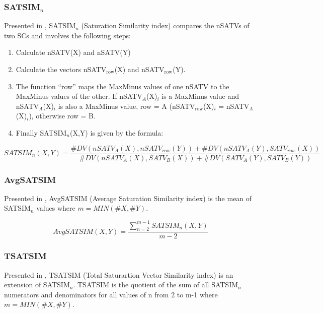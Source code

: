 \documentclass{article}
\begin{document}
\subsubsection{SATSIM$_{n}$}
\label{sec-13-9-2}

Presented in \citet[chap. 2.4]{Buchler1997}, SATSIM$_{n}$ (Saturation
Similarity index) compares the nSATVs of two SCs and involves the
following steps:
\begin{enumerate}
\item Calculate nSATV(X) and nSATV(Y)
\item Calculate the vectors nSATV$_{\mathrm{row}}$(X) and nSATV$_{\mathrm{row}}$(Y).
\item The function ``row'' maps the MaxMinus values of one nSATV to the
   MaxMinus values of the other. If nSATV$_{A}$(X)$_{i}$ is a MaxMinus
   value and nSATV$_{A}$(X)$_{i}$ is also a MaxMinus value, row = A
   (nSATV$_{\mathrm{row}}$(X)$_{i}$ = nSATV$_{A}$(X)$_{i}$), otherwise row = B.
\item Finally SATSIM$_{n}$(X,Y) is given by the formula:
\end{enumerate}

$$SATSIM_{n}(X,Y)=\frac{\#DV(nSATV_{A}(X),nSATV_{row}(Y))+\#DV(nSATV_{A}(Y),SATV_{row}(X))}{\#DV(nSATV_{A}(X),SATV_{B}(X))+\#DV(SATV_{A}(Y),SATV_{B}(Y))}$$
\subsubsection{AvgSATSIM}
\label{sec-13-9-3}

Presented in \citet[chap. 2.10]{Buchler1997}, AvgSATSIM (Average
Saturation Similarity index) is the mean of SATSIM$_{n}$ values where
$m=MIN(\#X,\#Y)$.

$$ AvgSATSIM(X,Y)=\frac{\sum_{n=2}^{m-1}{SATSIM_{n}(X,Y)}}{m-2}$$
\subsubsection{TSATSIM}
\label{sec-13-9-4}

Presented in \citet[chap. 2.10]{Buchler1997}, TSATSIM (Total
Saturartion Vector Similarity index) is an extension of
SATSIM$_{n}$. TSATSIM is the quotient of the sum of all SATSIM$_{n}$
numerators and denominators for all values of n from 2 to m-1 where
$m=MIN(\#X,\#Y)$.
\end{document}
